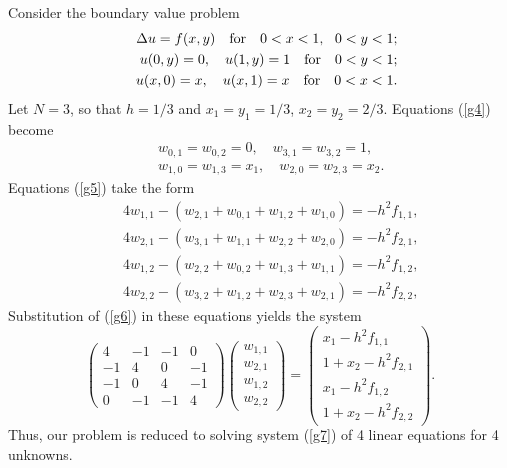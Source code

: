  
\begin{example}
Consider the boundary value problem
\begin{eqnarray}
&&\Delta u = f(x,y) \quad {\rm for} \quad 0< x< 1, \ \ 0< y< 1;  \nonumber \\
&&u(0,y)=0, \quad u(1,y)=1 \quad {\rm for} \quad 0< y< 1;  \nonumber \\
&&u(x,0)=x, \quad u(x,1)=x \quad {\rm for} \quad 0< x< 1.  \nonumber
\end{eqnarray}
Let $N=3$, so that $h=1/3$ and $x_{1}=y_{1}=1/3$, $x_{2}=y_{2}=2/3$.
Equations (\ref{g4}) become
\begin{eqnarray}
&&w_{0,1}=w_{0,2}=0, \quad w_{3,1}=w_{3,2}=1, \nonumber \\
&&w_{1,0}=w_{1,3}=x_{1}, \quad w_{2,0}=w_{2,3}=x_{2}. \label{g6}
\end{eqnarray}
Equations (\ref{g5}) take the form
\begin{eqnarray}
&&4w_{1,1}-\left(w_{2,1}+w_{0,1}+w_{1,2}+w_{1,0}\right)=-h^2f_{1,1}, \nonumber \\
&&4w_{2,1}-\left(w_{3,1}+w_{1,1}+w_{2,2}+w_{2,0}\right)=-h^2f_{2,1}, \nonumber \\
&&4w_{1,2}-\left(w_{2,2}+w_{0,2}+w_{1,3}+w_{1,1}\right)=-h^2f_{1,2}, \nonumber \\
&&4w_{2,2}-\left(w_{3,2}+w_{1,2}+w_{2,3}+w_{2,1}\right)=-h^2f_{2,2}, \nonumber
\end{eqnarray}
Substitution of (\ref{g6}) in these equations yields the system
\begin{equation}
\left(
\begin{array}{cccc}
4 &-1 &-1 &0 \\
-1 &4 &0 &-1 \\
-1 &0 &4 &-1 \\
0 &-1 &-1 &4
\end{array}\right)
\left(
\begin{array}{c}
w_{1,1} \\
w_{2,1} \\
w_{1,2} \\
w_{2,2}
\end{array}\right)=
\left(
\begin{array}{c}
x_{1}-h^2f_{1,1} \\
1+x_{2}-h^2f_{2,1} \\
x_{1}-h^2f_{1,2} \\
1+x_{2}-h^2f_{2,2}
\end{array}\right). \label{g7}
\end{equation}
Thus, our problem is reduced to solving system (\ref{g7})
of 4 linear equations for 4 unknowns.
\end{example}
 
